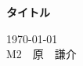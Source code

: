 \documentclass{jarticle}
\begin{document}
\vspace{-5mm}
\begin{center}
	\hspace{-4mm}\large\bf タイトル
\end{center}
\vspace{-20pt}%
\begin{flushright}
	\today\\
	M2　原　謙介
\end{flushright}
\hspace{10pt} %


\end{document}

